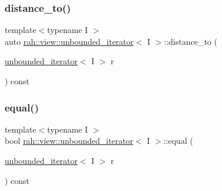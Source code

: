 \subsubsection{\texorpdfstring{distance\_to()}{distance\_to()}\hspace{0.1cm}{\footnotesize\ttfamily [2/2]}}
{\footnotesize\ttfamily template$<$typename I $>$ \\
auto \mbox{\hyperlink{structrah_1_1view_1_1unbounded__iterator}{rah\+::view\+::unbounded\+\_\+iterator}}$<$ I $>$\+::distance\+\_\+to (\begin{DoxyParamCaption}\item[{\mbox{\hyperlink{structrah_1_1view_1_1unbounded__iterator}{unbounded\+\_\+iterator}}$<$ I $>$}]{r }\end{DoxyParamCaption}) const\hspace{0.3cm}{\ttfamily [inline]}}

\mbox{\label{structrah_1_1view_1_1unbounded__iterator_ae9234860041ae72e3b2667d8121fa224}} 
\subsubsection{\texorpdfstring{equal()}{equal()}\hspace{0.1cm}{\footnotesize\ttfamily [1/2]}}
{\footnotesize\ttfamily template$<$typename I $>$ \\
bool \mbox{\hyperlink{structrah_1_1view_1_1unbounded__iterator}{rah\+::view\+::unbounded\+\_\+iterator}}$<$ I $>$\+::equal (\begin{DoxyParamCaption}\item[{\mbox{\hyperlink{structrah_1_1view_1_1unbounded__iterator}{unbounded\+\_\+iterator}}$<$ I $>$}]{r }\end{DoxyParamCaption}) const\hspace{0.3cm}{\ttfamily [inline]}}

\mbox{\label{structrah_1_1view_1_1unbounded__iterator_ae9234860041ae72e3b2667d8121fa224}} 
